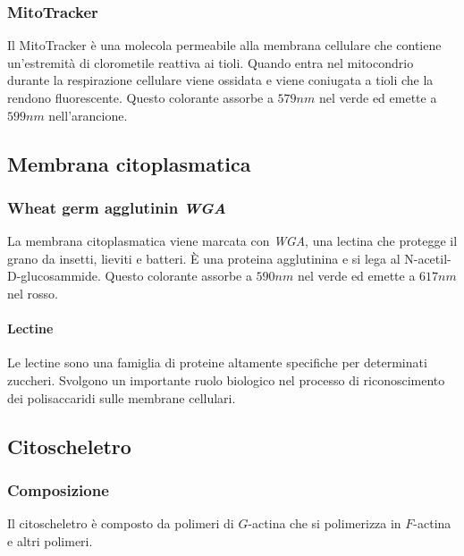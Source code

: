		\subsubsection{MitoTracker}
		Il MitoTracker \`e una molecola permeabile alla membrana cellulare che contiene un'estremit\`a di clorometile reattiva ai tioli.
		Quando entra nel mitocondrio durante la respirazione cellulare viene ossidata e viene coniugata a tioli che la rendono fluorescente.
		Questo colorante assorbe a $579\si{nm}$ nel verde ed emette a $599\si{nm}$ nell'arancione.

	\subsection{Membrana citoplasmatica}

		\subsubsection{Wheat germ agglutinin \emph{WGA}}
		La membrana citoplasmatica viene marcata con \emph{WGA}, una lectina che protegge il grano da insetti, lieviti e batteri.
		\`E una proteina agglutinina e si lega al N-acetil-D-glucosammide.
		Questo colorante assorbe a $590\si{nm}$ nel verde ed emette a $617\si{nm}$ nel rosso.
			
			\paragraph{Lectine}
			Le lectine sono una famiglia di proteine altamente specifiche per determinati zuccheri.
			Svolgono un importante ruolo biologico nel processo di riconoscimento dei polisaccaridi sulle membrane cellulari.
			

	\subsection{Citoscheletro}

		\subsubsection{Composizione}
		Il citoscheletro \`e composto da polimeri di $G$-actina che si polimerizza in $F$-actina e altri polimeri.

